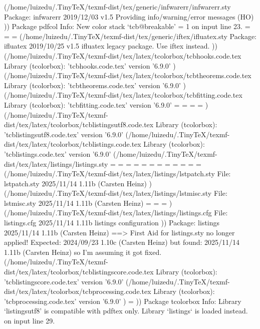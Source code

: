 (/home/luizedu/.TinyTeX/texmf-dist/tex/generic/infwarerr/infwarerr.sty
Package: infwarerr 2019/12/03 v1.5 Providing info/warning/error messages (HO)
))
Package pdfcol Info: New color stack `tcb@breakable' = 1 on input line 23.
\tcb@testbox=
\tcb@totalupperbox=
\tcb@totallowerbox=
(/home/luizedu/.TinyTeX/texmf-dist/tex/generic/iftex/ifluatex.sty
Package: ifluatex 2019/10/25 v1.5 ifluatex legacy package. Use iftex instead.
)) (/home/luizedu/.TinyTeX/texmf-dist/tex/latex/tcolorbox/tcbhooks.code.tex
Library (tcolorbox): 'tcbhooks.code.tex' version '6.9.0'
) (/home/luizedu/.TinyTeX/texmf-dist/tex/latex/tcolorbox/tcbtheorems.code.tex
Library (tcolorbox): 'tcbtheorems.code.tex' version '6.9.0'
) (/home/luizedu/.TinyTeX/texmf-dist/tex/latex/tcolorbox/tcbfitting.code.tex
Library (tcolorbox): 'tcbfitting.code.tex' version '6.9.0'
\tcbfitdim=
\tcb@lowerfitdim=
\tcb@upperfitdim=
\tcb@cur@hbadness=
) (/home/luizedu/.TinyTeX/texmf-dist/tex/latex/tcolorbox/tcblistingsutf8.code.tex
Library (tcolorbox): 'tcblistingsutf8.code.tex' version '6.9.0'
(/home/luizedu/.TinyTeX/texmf-dist/tex/latex/tcolorbox/tcblistings.code.tex
Library (tcolorbox): 'tcblistings.code.tex' version '6.9.0'
(/home/luizedu/.TinyTeX/texmf-dist/tex/latex/listings/listings.sty
\lst@mode=
\lst@gtempboxa=
\lst@token=
\lst@length=
\lst@currlwidth=
\lst@column=
\lst@pos=
\lst@lostspace=
\lst@width=
\lst@newlines=
\lst@lineno=
\lst@maxwidth=
(/home/luizedu/.TinyTeX/texmf-dist/tex/latex/listings/lstpatch.sty
File: lstpatch.sty 2025/11/14 1.11b (Carsten Heinz)
) (/home/luizedu/.TinyTeX/texmf-dist/tex/latex/listings/lstmisc.sty
File: lstmisc.sty 2025/11/14 1.11b (Carsten Heinz)
\c@lstnumber=
\lst@skipnumbers=
\lst@framebox=
) (/home/luizedu/.TinyTeX/texmf-dist/tex/latex/listings/listings.cfg
File: listings.cfg 2025/11/14 1.11b listings configuration
))
Package: listings 2025/11/14 1.11b (Carsten Heinz)
==> First Aid for listings.sty no longer applied!
    Expected:
        2024/09/23 1.10c (Carsten Heinz)
    but found:
        2025/11/14 1.11b (Carsten Heinz)
    so I'm assuming it got fixed.
(/home/luizedu/.TinyTeX/texmf-dist/tex/latex/tcolorbox/tcblistingscore.code.tex
Library (tcolorbox): 'tcblistingscore.code.tex' version '6.9.0'
(/home/luizedu/.TinyTeX/texmf-dist/tex/latex/tcolorbox/tcbprocessing.code.tex
Library (tcolorbox): 'tcbprocessing.code.tex' version '6.9.0'
)
\c@tcblisting=
))
Package tcolorbox Info: Library `listingsutf8' is compatible with pdftex only. Library `listings` is loaded instead. on input line 29.
